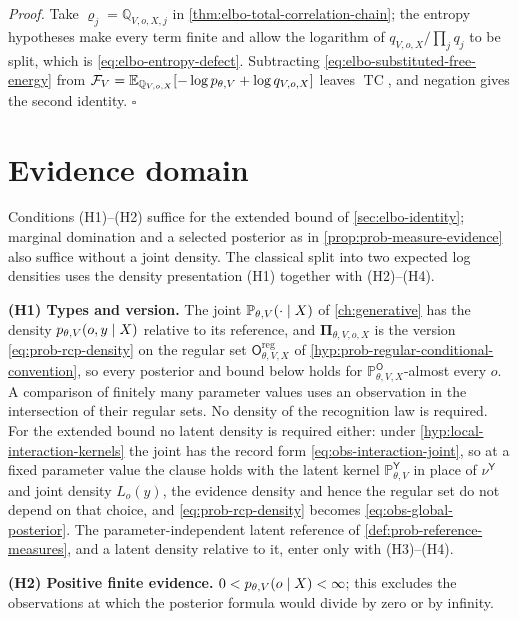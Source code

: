 \noindent\emph{Proof.}
Take $\varrho_j=\mathbb Q_{V,o,X,j}$ in
\cref{thm:elbo-total-correlation-chain}; the entropy hypotheses make every
term finite and allow the logarithm of $q_{V,o,X}/\prod_jq_j$ to be split,
which is \eqref{eq:elbo-entropy-defect}. Subtracting
\eqref{eq:elbo-substituted-free-energy} from
$\mathcal F_V=\mathbb E_{\mathbb Q_{V,o,X}}[-\log p_{\theta,V}+\log q_{V,o,X}]$ leaves
$\operatorname{TC}$, and negation gives the second identity. \hfill$\square$

\section{Evidence domain}
\label{sec:elbo-hypotheses}

\label{hyp:prob-regular-observation}
\label{hyp:prob-classical-split-elbo}
Conditions (H1)--(H2) suffice for the extended bound of
\cref{sec:elbo-identity}; marginal domination and a selected posterior
as in \cref{prop:prob-measure-evidence} also suffice without a joint density.
The classical split into two expected log densities uses the density
presentation (H1) together with (H2)--(H4).

\textbf{(H1) Types and version.} The joint
$\mathbb P_{\theta,V}(\cdot\mid X)$ of \cref{ch:generative} has the density
$p_{\theta,V}(o,y\mid X)$ relative to its reference, and
$\boldsymbol\Pi_{\theta,V,o,X}$ is the version \eqref{eq:prob-rcp-density} on
the regular set $\mathsf O^{\mathrm{reg}}_{\theta,V,X}$ of
\cref{hyp:prob-regular-conditional-convention}, so every posterior and bound
below holds for $\mathbb P^{\mathsf O}_{\theta,V,X}$-almost every $o$. A
comparison of finitely many parameter values uses an observation in the
intersection of their regular sets. No density of the recognition law is
required. For the extended bound no latent density is required either: under
\cref{hyp:local-interaction-kernels} the joint has the record form
\eqref{eq:obs-interaction-joint}, so at a fixed parameter value the clause holds
with the latent kernel $\mathbb P^{\mathsf Y}_{\theta,V}$ in place of
$\nu^{\mathsf Y}$ and joint density $L_o(y)$, the evidence density and hence the
regular set do not depend on that choice, and \eqref{eq:prob-rcp-density} becomes
\eqref{eq:obs-global-posterior}. The parameter-independent latent reference of
\cref{def:prob-reference-measures}, and a latent density relative to it, enter only
with (H3)--(H4).

\textbf{(H2) Positive finite evidence.}
$0<p_{\theta,V}(o\mid X)<\infty$; this excludes the observations at which
the posterior formula would divide by zero or by infinity.

